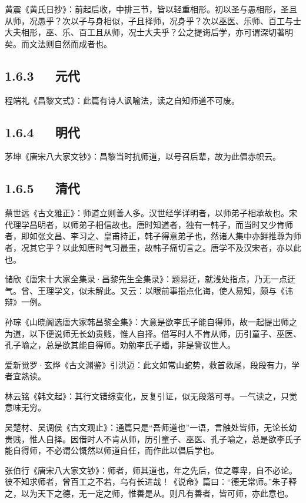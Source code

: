 \documentclass[letterpaper,12pt,english]{sphinxmanual}
\begin{document}
黄震《黄氏日抄》：前起后收，中排三节，皆以轻重相形。初以圣与愚相形，圣且从师，况愚乎？次以子与身相似，子且择师，况身乎？次以巫医、乐师、百工与士大夫相形，巫、乐、百工且从师，况士大夫乎？公之提诲后学，亦可谓深切著明矣。而文法则自然而成者也。


\subsection{1.6.3   元代}
\label{\detokenize{p01_u6563_u6587/_u97e9_u6108-_u5e08_u8bf4:id11}}
程端礼《昌黎文式》：此篇有诗人讽喻法，读之自知师道不可废。


\subsection{1.6.4   明代}
\label{\detokenize{p01_u6563_u6587/_u97e9_u6108-_u5e08_u8bf4:id12}}
茅坤《唐宋八大家文钞》：昌黎当时抗师道，以号召后辈，故为此倡赤帜云。


\subsection{1.6.5   清代}
\label{\detokenize{p01_u6563_u6587/_u97e9_u6108-_u5e08_u8bf4:id13}}
蔡世远《古文雅正》：师道立则善人多。汉世经学详明者，以师弟子相承故也。宋代理学昌明者，以师弟子相信故也。唐时知道者，独有一韩子，而当时又少肯师者，即如张文昌、李习之、皇甫持正，韩子得意弟子也，然诸人集中亦鲜推尊为师者，况其它乎？以此知唐时气习最重，故韩子痛切言之。唐学不及汉宋者，亦以此也。

储欣《唐宋十大家全集录·昌黎先生全集录》：题易迂，就浅处指点，乃无一点迂气。曾、王理学文，似未解此。又云：以眼前事指点化诲，使人易知，颇与《讳辩》一例。

孙琮《山晓阁选唐大家韩昌黎全集》：大意是欲李氏子能自得师，故一起提出师之为道，以下便说师无长幼贵贱，惟人自择。借写时人不肯从师，历引童子、巫医、孔子喻之，总是欲其能自得师。劝勉李氏子蟠，非是訾议世人。

爱新觉罗·玄烨《古文渊鉴》引洪迈：此文如常山蛇势，救首救尾，段段有力，学者宜熟读。

林云铭《韩文起》：其行文错综变化，反复引证，似无段落可寻。一气读之，只觉意味无穷。

吴楚材、吴调侯《古文观止》：通篇只是“吾师道也”一语，言触处皆师，无论长幼贵贱，惟人自择。因借时人不肯从师，历引童子、巫医、孔子喻之，总是欲李氏子能自得师，不必谓公慨然以师道自任，而作此以倡后学也。

张伯行《唐宋八大家文钞》：师者，师其道也，年之先后，位之尊卑，自不必论。彼不知求师者，曾百工之不若，乌有长进哉！《说命》篇曰：“德无常师。”朱子释之，以为天下之德，无一定之师，惟善是从。则凡有善者，皆可师，亦此意也。
\end{document}
